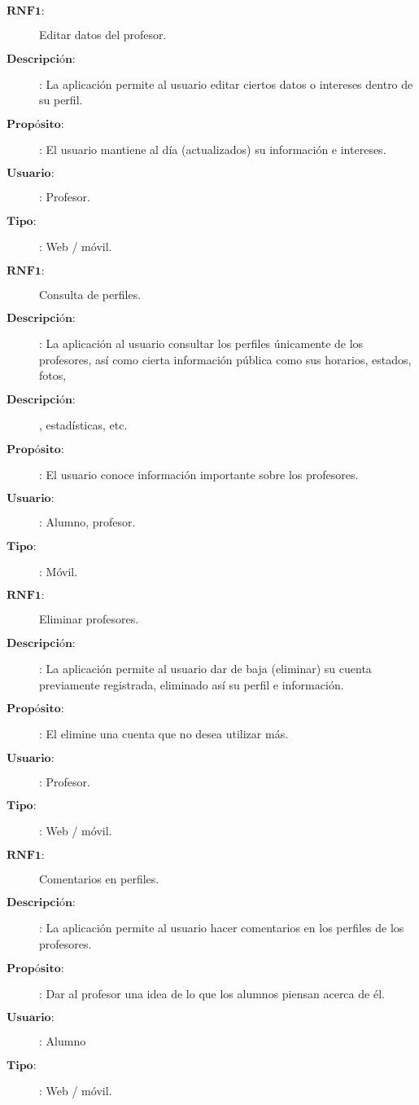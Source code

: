 \begin{description}
\item[$\textbf{RNF1:}$] Editar datos del profesor. 
\item[$\textbf{Descripción:}$]: La aplicación permite al usuario editar ciertos datos o intereses dentro de su perfil.
\item[$\textbf{Propósito:}$]: El usuario mantiene al día (actualizados) su información e intereses.
\item[$\textbf{Usuario:}$]: Profesor.
\item[$\textbf{Tipo:}$]: Web / móvil. \\

\item[$\textbf{RNF1:}$] Consulta de perfiles. 
\item[$\textbf{Descripción:}$]: La aplicación al usuario consultar los perfiles únicamente de los profesores, así como cierta información pública como sus horarios, estados, fotos, \item[$\textbf{Descripción:}$], estadísticas, etc.
\item[$\textbf{Propósito:}$]: El usuario conoce información importante sobre los profesores.
\item[$\textbf{Usuario:}$]: Alumno, profesor.
\item[$\textbf{Tipo:}$]: Móvil. \\

\item[$\textbf{RNF1:}$] Eliminar profesores. 
\item[$\textbf{Descripción:}$]: La aplicación permite al usuario dar de baja (eliminar) su cuenta previamente registrada, eliminado así su perfil e información.
\item[$\textbf{Propósito:}$]: El elimine una cuenta que no desea utilizar más. 
\item[$\textbf{Usuario:}$]: Profesor.
\item[$\textbf{Tipo:}$]: Web / móvil. \\

\item[$\textbf{RNF1:}$] Comentarios en perfiles. 
\item[$\textbf{Descripción:}$]: La aplicación permite al usuario hacer comentarios en los perfiles de los profesores. 
\item[$\textbf{Propósito:}$]: Dar al profesor una idea de lo que los alumnos piensan acerca de él. 
\item[$\textbf{Usuario:}$]: Alumno
\item[$\textbf{Tipo:}$]: Web / móvil.\\ 


\end{description}

